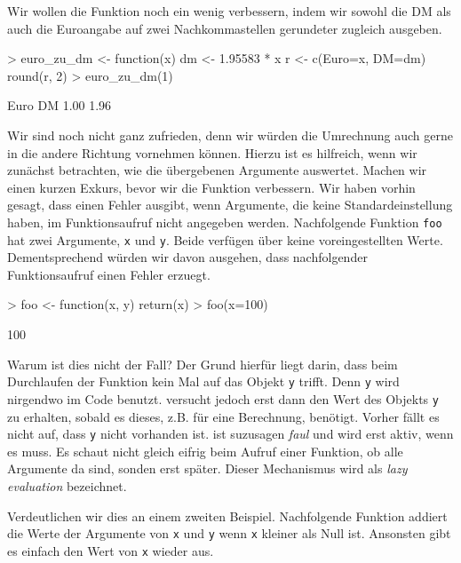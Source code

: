 \documentclass[12pt, a4paper,twoside,openany,x11names,svgnames]{memoir}
\begin{document}
Wir wollen die Funktion noch ein wenig verbessern, indem wir sowohl die DM als auch die Euroangabe auf zwei Nachkommastellen gerundeter zugleich ausgeben.

\begin{Schunk}
\begin{Sinput}
> euro_zu_dm <- function(x){
   dm <- 1.95583 * x
   r <- c(Euro=x, DM=dm)
   round(r, 2)
 }
> euro_zu_dm(1)
\end{Sinput}
\begin{Soutput}
Euro   DM 
1.00 1.96 
\end{Soutput}
\end{Schunk}

Wir sind noch nicht ganz zufrieden, denn wir würden die Umrechnung auch gerne in die andere Richtung vornehmen können. Hierzu ist es hilfreich, wenn wir zunächst betrachten, wie \R{} die übergebenen Argumente auswertet. Machen wir einen kurzen Exkurs, bevor wir die Funktion verbessern. Wir haben vorhin gesagt, dass \R{} einen Fehler ausgibt, wenn Argumente, die keine Standardeinstellung haben, im Funktionsaufruf nicht angegeben werden. Nachfolgende Funktion \texttt{foo} hat zwei Argumente, \texttt{x} und \texttt{y}. Beide verfügen über keine voreingestellten Werte. Dementsprechend würden wir davon ausgehen, dass nachfolgender Funktionsaufruf einen Fehler erzuegt.

\begin{Schunk}
\begin{Sinput}
> foo <- function(x, y){
   return(x)
 }
> foo(x=100)
\end{Sinput}
\begin{Soutput}
[1] 100
\end{Soutput}
\end{Schunk}

Warum ist dies nicht der Fall? Der Grund hierfür liegt darin, dass \R{} beim Durchlaufen der Funktion kein Mal auf das Objekt \texttt{y} trifft. Denn \texttt{y} wird nirgendwo im Code benutzt. \R{} versucht jedoch erst dann den Wert des Objekts \texttt{y} zu erhalten, sobald es dieses, z.B. für eine Berechnung, benötigt. Vorher fällt es \R{} nicht auf, dass \texttt{y} nicht vorhanden ist. \R{} ist suzusagen \emph{faul} und wird erst aktiv, wenn es muss. Es schaut nicht gleich eifrig beim Aufruf einer Funktion, ob alle Argumente da sind, sonden erst später. Dieser Mechanismus wird als \emph{lazy evaluation} bezeichnet. 

Verdeutlichen wir dies an einem zweiten Beispiel. Nachfolgende Funktion addiert die Werte der Argumente von \texttt{x} und \texttt{y} wenn \texttt{x} kleiner als Null ist. Ansonsten gibt es einfach den Wert von \texttt{x} wieder aus. 
\end{document}
